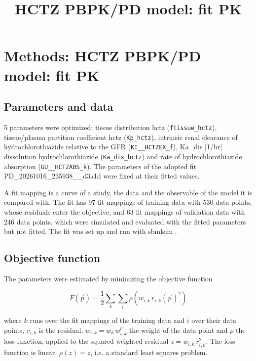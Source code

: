 \documentclass{article}
\title{HCTZ PBPK/PD model: fit PK}
\date{}
\begin{document}
\maketitle

\section{Methods: HCTZ PBPK/PD model: fit PK}

\subsection{Parameters and data}

5 parameters were optimized: tissue distribution hctz (\texttt{ftissue\_hctz}), tissue/plasma partition coefficient hctz (\texttt{Kp\_hctz}), intrinsic renal clearance of hydrochlorothiazide relative to the GFR (\texttt{KI\_\_HCTZEX\_f}), Ka\_dis [1/hr] dissolution hydrochlorothiazide (\texttt{Ka\_dis\_hctz}) and rate of hydrochlorothiazide absorption (\texttt{GU\_\_HCTZABS\_k}). The parameters of the adopted fit PD\_20261016\_235938\_\_d3a1d were fixed at their fitted values.

A fit mapping is a curve of a study, the data and the observable of the model it is compared with. The fit has 97 fit mappings of training data with 530 data points, whose residuals enter the objective; and 63 fit mappings of validation data with 246 data points, which were simulated and evaluated with the fitted parameters but not fitted. The fit was set up and run with sbmlsim \cite{Koenig2026_sbmlsim}.

\subsection{Objective function}

The parameters were estimated by minimizing the objective function

\begin{equation}
F(\vec{p}) = \frac{1}{2} \sum_{k} \sum_{i} \rho\left(w_{i,k}\, r_{i,k}(\vec{p})^2\right)
\end{equation}

where $k$ runs over the fit mappings of the training data and $i$ over their data points, $r_{i,k}$ is the residual, $w_{i,k} = w_k\, w^{p}_{i,k}$ the weight of the data point and $\rho$ the loss function, applied to the squared weighted residual $z = w_{i,k}\, r_{i,k}^2$. The loss function is linear, $\rho(z) = z$, i.e. a standard least squares problem.
\end{document}
